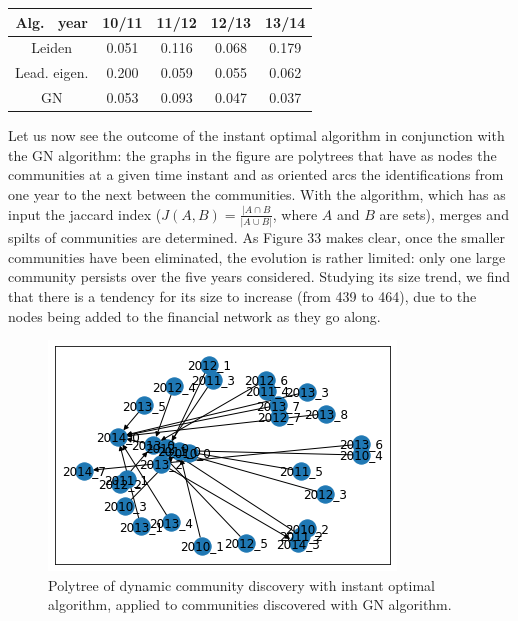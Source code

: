 \documentclass[sigchi]{acmart}
\begin{document}
\begin{center}
\begin{tabular}{|c|c|c|c|c|}
\hline
Alg. \ year & 10/11 & 11/12 & 12/13 & 13/14 \\
\hline
Leiden & 0.051 & 0.116 & 0.068 & 0.179\\
\hline
Lead. eigen. & 0.200  & 0.059 & 0.055 & 0.062 \\
\hline
GN & 0.053 & 0.093 & 0.047 & 0.037 \\
\hline
\end{tabular}
\end{center}

Let us now see the outcome of the instant optimal algorithm in conjunction with the GN algorithm: the graphs in the figure are polytrees that have as nodes the communities at a given time instant and as oriented arcs the identifications from one year to the next between the communities. With the algorithm, which has as input the jaccard index ($J(A, B) = \frac{|A \cap B}{|A \cup B|} $, where $A$ and $B$ are sets), merges and spilts of communities are determined. 
As Figure 33 makes clear, once the smaller communities have been eliminated, the evolution is rather limited: only one large community persists over the five years considered. Studying its size trend, we find that there is a tendency for its size to increase (from 439 to 464), due to the nodes being added to the financial network as they go along.

\begin{figure}[H]
	\centering
	\includegraphics[width=\linewidth]{polyt GN full.png}
	\caption{Polytree of dynamic community discovery with instant optimal algorithm, applied to communities discovered with GN algorithm.}
\end{figure}
\end{document}
